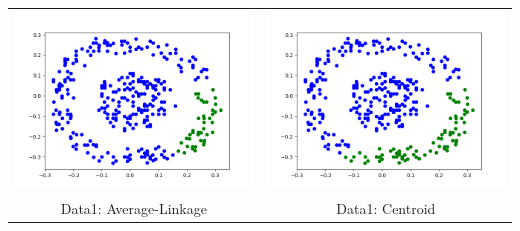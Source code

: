 \documentclass{article}
\begin{document}
\begin{tabular}{c|c}
\includegraphics[scale=0.4]{hac_images/data1average.png}&\includegraphics[scale=0.4]{hac_images/data1centroid.png}\\
{Data1: Average-Linkage}&{Data1: Centroid}\\

\end{tabular}
\end{document}
